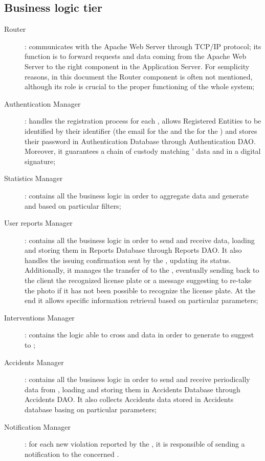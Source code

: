 \documentclass[../../DD.tex]{subfiles}
\begin{document}
\subsection{Business logic tier\label{sect:2.2.3}}
	\begin{description}
	\item[Router]: communicates with the Apache Web Server through TCP/IP protocol; its function is to forward requests and data coming from the Apache Web Server to the right component in the Application Server. For semplicity reasons, in this document the Router component is often not mentioned, although its role is crucial to the proper functioning of the whole system;
	 
	\item[Authentication Manager]: handles the registration process for each , allows Registered Entities to be identified by their identifier (the email for the  and the  for the ) and stores their password in Authentication Database through Authentication DAO. Moreover, it guarantees a chain of custody matching ' data and  in a digital signature;
	
	\item[Statistics Manager]: contains all the business logic in order to aggregate  data and generate  and   based on particular filters;
	
	\item[User reports Manager]: contains all the business logic in order to send and receive  data, loading and storing them in Reports Database through Reports DAO. It also handles the  issuing confirmation sent by the , updating its status. Additionally, it manages the transfer of  to the , eventually sending back to the client the recognized license plate or a message suggesting to re-take the photo if it has not been possible to recognize the license plate. At the end it allows specific  information retrieval based on particular parameters;
	
	\item[Interventions Manager]: contains the logic able to cross  and  data in order to generate  to suggest to ;
	
	\item[Accidents Manager]: contains all the business logic in order to send and receive periodically  data from , loading and storing them in Accidents Database through Accidents DAO. It also collects Accidents data stored in Accidents database basing on particular parameters;
	
	\item[Notification Manager]: for each new violation reported by the , it is responsible of sending a notification to the concerned .
	\end{description}
\end{document}
